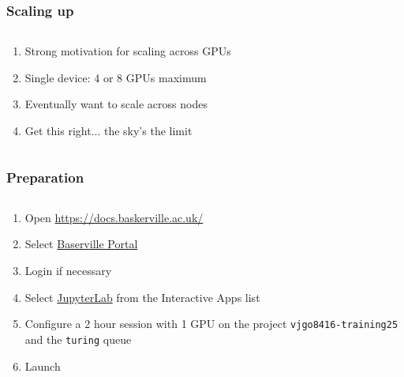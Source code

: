 \documentclass[
	notes=none,
	aspectratio=169
]{beamer}
\begin{document}

\begin{frame}
\frametitle{Scaling up}

\begin{columns}[T]
\begin{column}[T]{1.0\textwidth}
\setlength{\parskip}{0.5em}

\vspace{-0.5cm}
\begin{enumerate}
\setlength{\parskip}{0.5em}
\item Strong motivation for scaling across GPUs
\item Single device: 4 or 8 GPUs maximum
\item Eventually want to scale across nodes
\item Get this right... the sky's the limit
\end{enumerate}

\end{column}
\end{columns}

\end{frame}
\note{
}


\begin{frame}
\frametitle{Preparation}

\begin{columns}[T]
\begin{column}[T]{1.0\textwidth}
\setlength{\parskip}{0.5em}

\vspace{0.0cm}
\begin{enumerate}
\setlength{\parskip}{0.5em}
\item Open \url{https://docs.baskerville.ac.uk/}
\item Select \href{https://portal.baskerville.ac.uk/}{Baserville Portal}
\item Login if necessary
\item Select \href{https://portal.baskerville.ac.uk/pun/sys/dashboard/batch_connect/sys/bc_bask_jupyter/session_contexts/new}{JupyterLab} from the Interactive Apps list
\item Configure a 2 hour session with 1 GPU on the project {\tt vjgo8416-training25} and the {\tt turing} queue
\item Launch
\end{enumerate}

\end{column}
\end{columns}

\end{frame}
\note{
}
\end{document}
